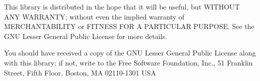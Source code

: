 This library is distributed in the hope that it will be useful, but W\+I\+T\+H\+O\+UT A\+NY W\+A\+R\+R\+A\+N\+TY; without even the implied warranty of M\+E\+R\+C\+H\+A\+N\+T\+A\+B\+I\+L\+I\+TY or F\+I\+T\+N\+E\+SS F\+OR A P\+A\+R\+T\+I\+C\+U\+L\+AR P\+U\+R\+P\+O\+SE. See the G\+NU Lesser General Public License for more details.

You should have received a copy of the G\+NU Lesser General Public License along with this library; if not, write to the Free Software Foundation, Inc., 51 Franklin Street, Fifth Floor, Boston, MA 02110-\/1301 U\+SA 